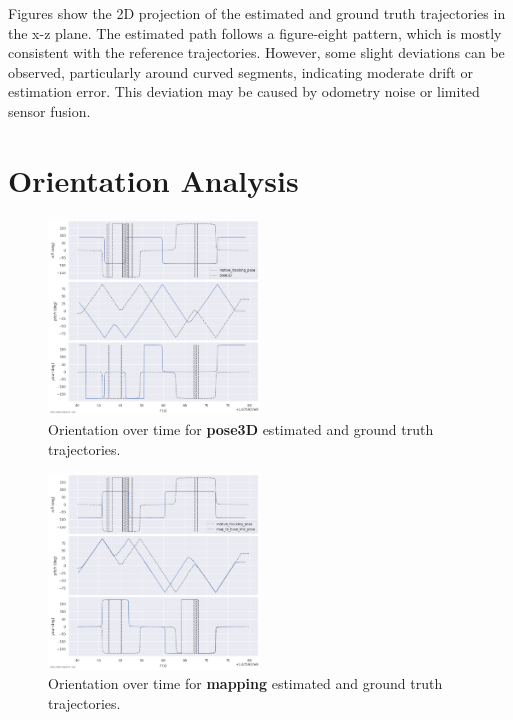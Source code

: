 \documentclass[11pt]{article}
\begin{document}
\FloatBarrier %

Figures show the 2D projection of the estimated and ground truth trajectories in the x-z plane. The estimated path follows a figure-eight pattern, which is mostly consistent with the reference trajectories. However, some slight deviations can be observed, particularly around curved segments, indicating moderate drift or estimation error. This deviation may be caused by odometry noise or limited sensor fusion.

\section{Orientation Analysis}

\begin{figure}[H]
    \centering
    \includegraphics[width=0.5\textwidth]{figures/evo_pose3D_rpy.png}
    \caption{Orientation over time for \textbf{pose3D} estimated and ground truth trajectories.}
    \label{fig:pose3D_rpy}
\end{figure}
\begin{figure}[H]
    \centering
    \includegraphics[width=0.5\textwidth]{figures/evo_mapping_rpy.png}
    \caption{Orientation over time for \textbf{mapping} estimated and ground truth trajectories.}
    \label{fig:mapping_rpy}
\end{figure}
\end{document}
